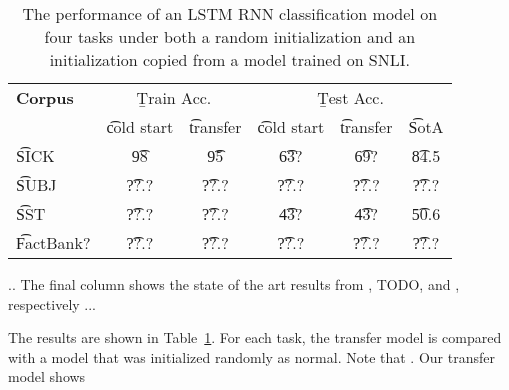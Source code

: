 \begin{table}
\begin{center}
\begin{tabular}{l@{\hskip \colspaceL}c@{\hskip \colspaceS}c@{\hskip \colspaceS}c@{\hskip \colspaceS}c@{\hskip \colspaceS}c}
\hline
\textbf{Corpus} & \multicolumn{2}{c}{\b{Train Acc.}} &\multicolumn{3}{c}{ \b{Test Acc.}} \\
 & \t{cold start} & \t{transfer} & \t{cold start} & \t{transfer} & \t{SotA} \\
\hline
\t{SICK}            & \t{98} & \t{95} & \t{63?} & \t{69?} & \t{84.5} \\
\t{SUBJ}          & \t{??.?} & \t{??.?} & \t{??.?} & \t{??.?}& \t{??.?} \\
\t{SST}          & \t{??.?} & \t{??.?} & \t{43?} & \t{43?} & \t{50.6}\\
\t{FactBank?}          & \t{??.?} & \t{??.?} & \t{??.?} & \t{??.?}& \t{??.?} \\
\hline
\end{tabular}
\end{center}

\caption{\label{tab:transferresults}
The performance of an LSTM RNN classification model on four tasks under both a random initialization and an initialization copied from a model trained on SNLI. } 

\end{table}
..
The final column shows the state of the art results from \cite{lai2014illinois}, TODO, and \cite{tai2015improved}, respectively
...


The results are shown in Table~\ref{tab:transferresults}. For each task, the transfer model is compared with a model that was initialized randomly as normal. Note that . Our transfer model shows 
